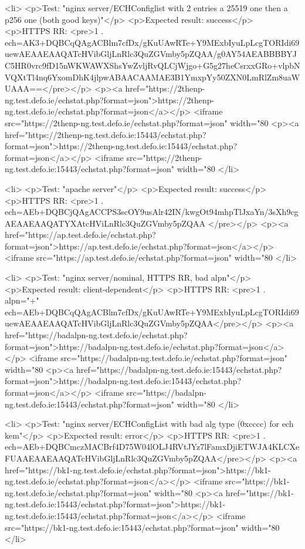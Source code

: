
<li>
<p>Test: "nginx server/ECHConfiglist with 2 entries a 25519 one then a p256 one (both good keys)"</p>
<p>Expected result: success</p>
<p>HTTPS RR: <pre>1 . ech=AK3+DQBCqQAgACBlm7cfDx/gKuUAwRTe+Y9MExbIyuLpLcgTORIdi69uewAEAAEAAQATcHVibGljLnRlc3QuZGVmby5pZQAA/g0AY54AEABBBBYJC5HR0vrc9fD15nWKWAWXShsYwZvljRvQLCjWjgo+G5g27heCsrxxGRo+vlpbNVQXtTl4nq6YxomDhK4jlpwABAACAAMAE3B1YmxpYy50ZXN0LmRlZm8uaWUAAA==</pre></p>
<p><a href="https://2thenp-ng.test.defo.ie/echstat.php?format=json">https://2thenp-ng.test.defo.ie/echstat.php?format=json</a></p>
<iframe src="https://2thenp-ng.test.defo.ie/echstat.php?format=json" width="80%
<p><a href="https://2thenp-ng.test.defo.ie:15443/echstat.php?format=json">https://2thenp-ng.test.defo.ie:15443/echstat.php?format=json</a></p>
<iframe src="https://2thenp-ng.test.defo.ie:15443/echstat.php?format=json" width="80%
</li>

<li>
<p>Test: "apache server"</p>
<p>Expected result: success</p>
<p>HTTPS RR: <pre>1 . ech=AEb+DQBCjQAgACCPS3scOY9usAlr42IN/kwgOt94mhpTlJxaYn/3sXh9cgAEAAEAAQATYXAtcHViLnRlc3QuZGVmby5pZQAA
</pre></p>
<p><a href="https://ap.test.defo.ie/echstat.php?format=json">https://ap.test.defo.ie/echstat.php?format=json</a></p>
<iframe src="https://ap.test.defo.ie/echstat.php?format=json" width="80%
</li>

<li>
<p>Test: "nginx server/nominal, HTTPS RR, bad alpn"</p>
<p>Expected result: client-dependent</p>
<p>HTTPS RR: <pre>1 . alpn="+" ech=AEb+DQBCqQAgACBlm7cfDx/gKuUAwRTe+Y9MExbIyuLpLcgTORIdi69uewAEAAEAAQATcHVibGljLnRlc3QuZGVmby5pZQAA</pre></p>
<p><a href="https://badalpn-ng.test.defo.ie/echstat.php?format=json">https://badalpn-ng.test.defo.ie/echstat.php?format=json</a></p>
<iframe src="https://badalpn-ng.test.defo.ie/echstat.php?format=json" width="80%
<p><a href="https://badalpn-ng.test.defo.ie:15443/echstat.php?format=json">https://badalpn-ng.test.defo.ie:15443/echstat.php?format=json</a></p>
<iframe src="https://badalpn-ng.test.defo.ie:15443/echstat.php?format=json" width="80%
</li>

<li>
<p>Test: "nginx server/ECHConfigList with bad alg type (0xcccc) for ech kem"</p>
<p>Expected result: error</p>
<p>HTTPS RR: <pre>1 . ech=AEb+DQBCmczMACBrf4D75W04lOLJ4RVtJYz7lFamxDjiETWJA4KLCXeFUAAEAAEAAQATcHVibGljLnRlc3QuZGVmby5pZQAA</pre></p>
<p><a href="https://bk1-ng.test.defo.ie/echstat.php?format=json">https://bk1-ng.test.defo.ie/echstat.php?format=json</a></p>
<iframe src="https://bk1-ng.test.defo.ie/echstat.php?format=json" width="80%
<p><a href="https://bk1-ng.test.defo.ie:15443/echstat.php?format=json">https://bk1-ng.test.defo.ie:15443/echstat.php?format=json</a></p>
<iframe src="https://bk1-ng.test.defo.ie:15443/echstat.php?format=json" width="80%
</li>

